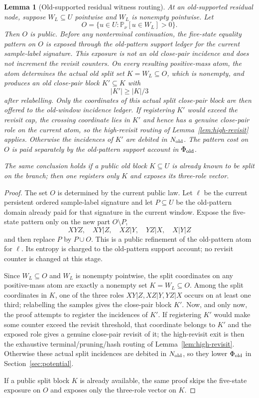 \documentclass[11pt]{article}
\newtheorem{lemma}[theorem]{Lemma}
\newcommand{\Prb}{\mathbb P}
\begin{document}
\begin{lemma}[Old-supported residual witness routing]
\label{lem:old-residual-routing}
At an old-supported residual node, suppose $W_L\subseteq U$ pointwise and
$W_L$ is nonempty pointwise.  Let
\[
  O=\{u\in U:\Prb_\nu[u\in W_L]>0\}.
\]
Then $O$ is public.  Before any nonterminal continuation, the five-state
equality pattern on $O$ is exposed through the old-pattern support ledger for
the current sample-label signature.  This exposure is not an old close-pair
incidence and does not increment the revisit counters.  On every resulting
positive-mass atom, the atom determines the actual old split set
$K=W_L\subseteq O$, which is nonempty, and produces an old close-pair block
$K'\subseteq K$ with
\[
  |K'|\ge |K|/3
\]
after relabelling.  Only the coordinates of this actual split close-pair block
are then offered to the old-window incidence ledger.  If registering $K'$
would exceed the revisit cap, the crossing coordinate lies in $K'$ and hence
has a genuine close-pair role on the current atom, so the high-revisit routing
of Lemma~\ref{lem:high-revisit} applies.  Otherwise the incidences of $K'$ are
debited in $N_{\rm old}$.  The pattern cost on $O$ is paid separately by the
old-pattern support account in $\Phi_{\rm old}$.

The same conclusion holds if a public old block $K\subseteq U$ is already
known to be split on the branch; then one registers only $K$ and exposes its
three-role vector.
\end{lemma}

\begin{proof}
The set $O$ is determined by the current public law.  Let $\ell$ be the current
persistent ordered sample-label signature and let $P\subseteq U$ be the
old-pattern domain already paid for that signature in the current window.
Expose the five-state pattern only on the new part $O\setminus P$,
\[
  XYZ,\quad XY|Z,\quad XZ|Y,\quad YZ|X,\quad X|Y|Z
\]
and then replace $P$ by $P\cup O$.  This is a public refinement of
the old-pattern atom for $\ell$.  Its entropy is charged to the old-pattern
support account; no revisit counter is changed at this stage.

Since $W_L\subseteq O$ and $W_L$ is nonempty pointwise, the split coordinates
on any positive-mass atom are exactly a nonempty set $K=W_L\subseteq O$.
Among the split coordinates in $K$, one of the three roles
$XY|Z,XZ|Y,YZ|X$ occurs on at least one third; relabelling the samples gives
the close-pair block $K'$.  Now, and only now, the proof attempts to register
the incidences of $K'$.  If registering $K'$ would make some counter exceed
the revisit threshold, that coordinate belongs to $K'$ and the exposed role
gives a genuine close-pair revisit of it; the high-revisit exit is then the
exhaustive terminal/pruning/hash routing of Lemma~\ref{lem:high-revisit}.
Otherwise these actual split incidences are debited in $N_{\rm old}$, so they
lower $\Phi_{\rm old}$ in Section~\ref{sec:potential}.

If a public split block $K$ is already available, the same proof skips the
five-state exposure on $O$ and exposes only the three-role vector on $K$.
\end{proof}
\end{document}
